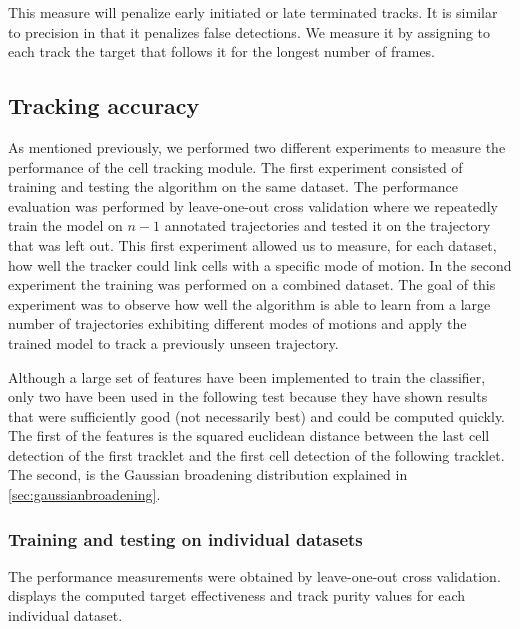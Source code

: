 	This measure will penalize early initiated or late terminated tracks. It is similar to precision in that it penalizes false detections. We measure it by assigning to each track the target that follows it for the longest number of frames. 
	
	\subsection{Tracking accuracy}
	
	
		As mentioned previously, we performed two different experiments to measure the performance of the cell tracking module. The first experiment consisted of training and testing the algorithm on the same dataset. The performance evaluation was performed by leave-one-out cross validation where we repeatedly train the model on $n-1$ annotated trajectories and tested it on the trajectory that was left out. This first experiment allowed us to measure, for each dataset, how well the tracker could link cells with a specific mode of motion. In the second experiment the training was performed on a combined dataset. The goal of this experiment was to observe how well the algorithm is able to learn from a large number of trajectories exhibiting different modes of motions and apply the trained model to track a previously unseen trajectory.
		
		Although a large set of features have been implemented to train the classifier, only two have been used in the following test because they have shown results that were sufficiently good (not necessarily best) and could be computed quickly. The first of the features is the squared euclidean distance between the last cell detection of the first tracklet and the first cell detection of the following tracklet. The second, is the Gaussian broadening distribution explained in \cref{sec:gaussianbroadening}.
	
		\subsubsection{Training and testing on individual datasets}
		
		The performance measurements were obtained by leave-one-out cross validation.  displays the computed target effectiveness and track purity values for each individual dataset.
		
